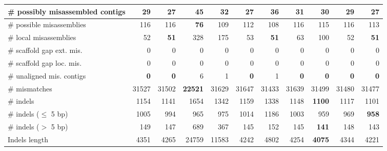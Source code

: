 \documentclass[12pt,a4paper]{article}
\begin{document}
\begin{table}[ht]
\begin{center}
\begin{tabular}{|l*{10}{|r}|}
\# possibly misassembled contigs & 29 & {\bf 27} & 45 & 32 & {\bf 27} & 36 & 31 & 30 & 29 & {\bf 27} \\ \hline
\hspace{5mm}\# possible misassemblies & 116 & 116 & {\bf 76} & 109 & 112 & 108 & 116 & 115 & 116 & 113 \\ \hline
\# local misassemblies & 52 & {\bf 51} & 328 & 175 & 53 & {\bf 51} & 63 & 100 & 52 & {\bf 51} \\ \hline
\# scaffold gap ext. mis. & 0 & 0 & 0 & 0 & 0 & 0 & 0 & 0 & 0 & 0 \\ \hline
\# scaffold gap loc. mis. & 0 & 0 & 0 & 0 & 0 & 0 & 0 & 0 & 0 & 0 \\ \hline
\# unaligned mis. contigs & {\bf 0} & {\bf 0} & 6 & 1 & {\bf 0} & 1 & {\bf 0} & {\bf 0} & {\bf 0} & {\bf 0} \\ \hline
\# mismatches & 31527 & 31502 & {\bf 22521} & 31629 & 31647 & 31433 & 31639 & 31499 & 31480 & 31477 \\ \hline
\# indels & 1154 & 1141 & 1654 & 1342 & 1159 & 1338 & 1148 & {\bf 1100} & 1117 & 1101 \\ \hline
\hspace{5mm}\# indels ($\leq$ 5 bp) & 1005 & 994 & 965 & 975 & 1014 & 1186 & 1003 & 959 & 969 & {\bf 958} \\ \hline
\hspace{5mm}\# indels ($>$ 5 bp) & 149 & 147 & 689 & 367 & 145 & 152 & 145 & {\bf 141} & 148 & 143 \\ \hline
Indels length & 4351 & 4265 & 24759 & 11583 & 4242 & 4802 & 4254 & {\bf 4075} & 4344 & 4221 \\ \hline
\end{tabular}
\end{center}
\end{table}
\end{document}
